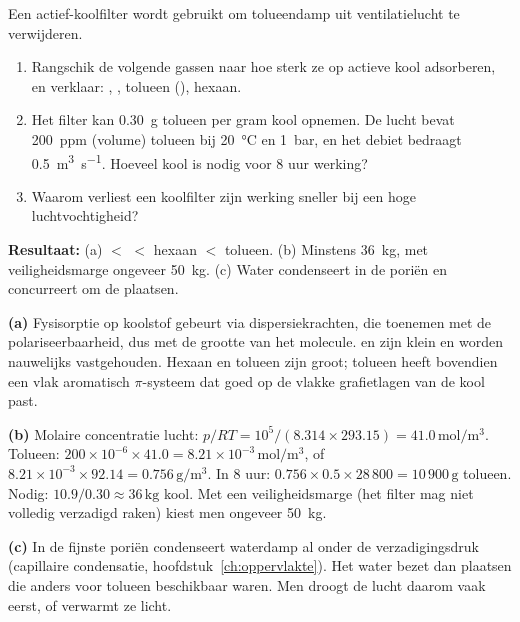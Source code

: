 \begin{oefening}
Een actief-koolfilter wordt gebruikt om tolueendamp uit ventilatielucht te verwijderen.
\begin{enumerate}
\item[(a)] Rangschik de volgende gassen naar hoe sterk ze op actieve kool adsorberen, en verklaar: , , tolueen (), hexaan.
\item[(b)] Het filter kan \SI{0.30}{\gram} tolueen per gram kool opnemen. De lucht bevat \SI{200}{ppm} (volume) tolueen bij \SI{20}{\celsius} en \SI{1}{\bar}, en het debiet bedraagt \SI{0.5}{\cubic\metre\per\second}. Hoeveel kool is nodig voor 8 uur werking?
\item[(c)] Waarom verliest een koolfilter zijn werking sneller bij een hoge luchtvochtigheid?
\end{enumerate}
\end{oefening}
\begin{oplossing}
\textbf{Resultaat:} (a)  $<$  $<$ hexaan $<$ tolueen. (b) Minstens \SI{36}{\kilo\gram}, met veiligheidsmarge ongeveer \SI{50}{\kilo\gram}. (c) Water condenseert in de pori\"en en concurreert om de plaatsen.

\textbf{(a)} Fysisorptie op koolstof gebeurt via dispersiekrachten, die toenemen met de polariseerbaarheid, dus met de grootte van het molecule.  en  zijn klein en worden nauwelijks vastgehouden. Hexaan en tolueen zijn groot; tolueen heeft bovendien een vlak aromatisch $\pi$-systeem dat goed op de vlakke grafietlagen van de kool past.

\textbf{(b)} Molaire concentratie lucht: $p/RT = 10^5/(8.314 \times 293.15) = 41.0\,\mathrm{mol/m^3}$. Tolueen: $200\times10^{-6} \times 41.0 = 8.21\times10^{-3}\,\mathrm{mol/m^3}$, of $8.21\times10^{-3} \times 92.14 = 0.756\,\mathrm{g/m^3}$. In 8 uur: $0.756 \times 0.5 \times 28\,800 = 10\,900\,\mathrm{g}$ tolueen. Nodig: $10.9/0.30 \approx 36\,\mathrm{kg}$ kool. Met een veiligheidsmarge (het filter mag niet volledig verzadigd raken) kiest men ongeveer \SI{50}{\kilo\gram}.

\textbf{(c)} In de fijnste pori\"en condenseert waterdamp al onder de verzadigingsdruk (capillaire condensatie, hoofdstuk~\ref{ch:oppervlakte}). Het water bezet dan plaatsen die anders voor tolueen beschikbaar waren. Men droogt de lucht daarom vaak eerst, of verwarmt ze licht.
\end{oplossing}
